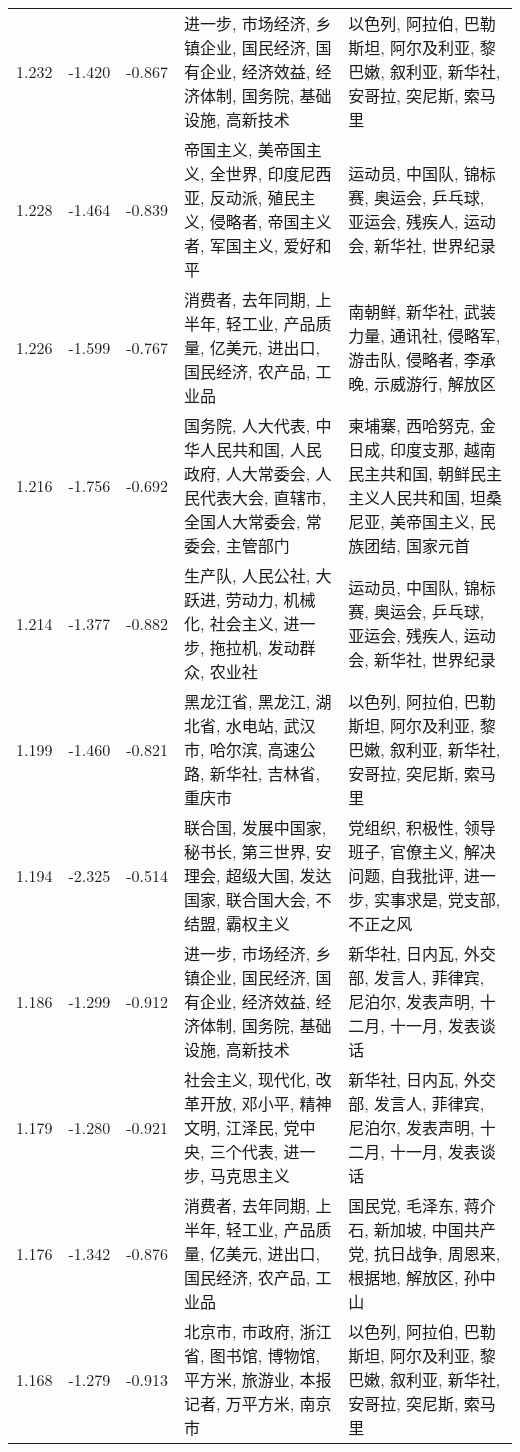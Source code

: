 \begin{tabular}{cccp{5cm}p{5cm}}
1.232 & -1.420 & -0.867 & 进一步, 市场经济, 乡镇企业, 国民经济, 国有企业, 经济效益, 经济体制, 国务院, 基础设施, 高新技术 & 以色列, 阿拉伯, 巴勒斯坦, 阿尔及利亚, 黎巴嫩, 叙利亚, 新华社, 安哥拉, 突尼斯, 索马里 \\
1.228 & -1.464 & -0.839 & 帝国主义, 美帝国主义, 全世界, 印度尼西亚, 反动派, 殖民主义, 侵略者, 帝国主义者, 军国主义, 爱好和平 & 运动员, 中国队, 锦标赛, 奥运会, 乒乓球, 亚运会, 残疾人, 运动会, 新华社, 世界纪录 \\
1.226 & -1.599 & -0.767 & 消费者, 去年同期, 上半年, 轻工业, 产品质量, 亿美元, 进出口, 国民经济, 农产品, 工业品 & 南朝鲜, 新华社, 武装力量, 通讯社, 侵略军, 游击队, 侵略者, 李承晚, 示威游行, 解放区 \\
1.216 & -1.756 & -0.692 & 国务院, 人大代表, 中华人民共和国, 人民政府, 人大常委会, 人民代表大会, 直辖市, 全国人大常委会, 常委会, 主管部门 & 柬埔寨, 西哈努克, 金日成, 印度支那, 越南民主共和国, 朝鲜民主主义人民共和国, 坦桑尼亚, 美帝国主义, 民族团结, 国家元首 \\
1.214 & -1.377 & -0.882 & 生产队, 人民公社, 大跃进, 劳动力, 机械化, 社会主义, 进一步, 拖拉机, 发动群众, 农业社 & 运动员, 中国队, 锦标赛, 奥运会, 乒乓球, 亚运会, 残疾人, 运动会, 新华社, 世界纪录 \\
1.199 & -1.460 & -0.821 & 黑龙江省, 黑龙江, 湖北省, 水电站, 武汉市, 哈尔滨, 高速公路, 新华社, 吉林省, 重庆市 & 以色列, 阿拉伯, 巴勒斯坦, 阿尔及利亚, 黎巴嫩, 叙利亚, 新华社, 安哥拉, 突尼斯, 索马里 \\
1.194 & -2.325 & -0.514 & 联合国, 发展中国家, 秘书长, 第三世界, 安理会, 超级大国, 发达国家, 联合国大会, 不结盟, 霸权主义 & 党组织, 积极性, 领导班子, 官僚主义, 解决问题, 自我批评, 进一步, 实事求是, 党支部, 不正之风 \\
1.186 & -1.299 & -0.912 & 进一步, 市场经济, 乡镇企业, 国民经济, 国有企业, 经济效益, 经济体制, 国务院, 基础设施, 高新技术 & 新华社, 日内瓦, 外交部, 发言人, 菲律宾, 尼泊尔, 发表声明, 十二月, 十一月, 发表谈话 \\
1.179 & -1.280 & -0.921 & 社会主义, 现代化, 改革开放, 邓小平, 精神文明, 江泽民, 党中央, 三个代表, 进一步, 马克思主义 & 新华社, 日内瓦, 外交部, 发言人, 菲律宾, 尼泊尔, 发表声明, 十二月, 十一月, 发表谈话 \\
1.176 & -1.342 & -0.876 & 消费者, 去年同期, 上半年, 轻工业, 产品质量, 亿美元, 进出口, 国民经济, 农产品, 工业品 & 国民党, 毛泽东, 蒋介石, 新加坡, 中国共产党, 抗日战争, 周恩来, 根据地, 解放区, 孙中山 \\
1.168 & -1.279 & -0.913 & 北京市, 市政府, 浙江省, 图书馆, 博物馆, 平方米, 旅游业, 本报记者, 万平方米, 南京市 & 以色列, 阿拉伯, 巴勒斯坦, 阿尔及利亚, 黎巴嫩, 叙利亚, 新华社, 安哥拉, 突尼斯, 索马里 \\

\end{tabular}
